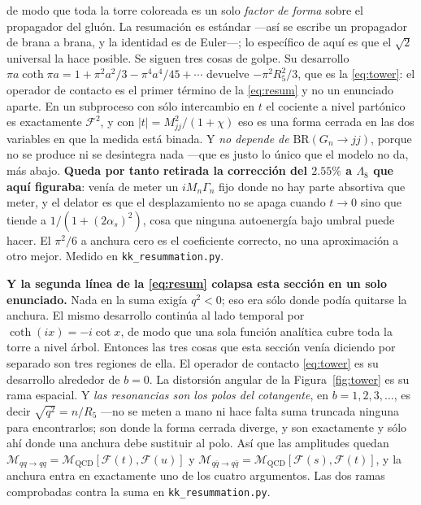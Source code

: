 \documentclass[11pt,a4paper]{article}
\begin{document}
\noindent de modo que toda la torre coloreada es un solo \emph{factor de forma} sobre el propagador
del gluón. La resumación es estándar ---así se escribe un propagador de brana a brana, y la
identidad es de Euler---; lo específico de aquí es que el $\sqrt2$ universal la hace posible. Se
siguen tres cosas de golpe. Su desarrollo $\pi a\coth\pi a=1+\pi^2a^2/3-\pi^4a^4/45+\cdots$
devuelve $-\pi^2R_5^2/3$, que es la \eqref{eq:tower}: el operador de contacto es el primer término
de la \eqref{eq:resum} y no un enunciado aparte. En un subproceso con sólo intercambio en $t$ el
cociente a nivel partónico es exactamente $\mathcal F^2$, y con $|t|=M_{jj}^2/(1+\chi)$ eso es una
forma cerrada en las dos variables en que la medida está binada. Y \emph{no depende de}
$\mathrm{BR}(G_n\to jj)$, porque no se produce ni se desintegra nada ---que es justo lo único que
el modelo no da, más abajo. \textbf{Queda por tanto retirada la corrección del $2.55\%$ a
$\Lambda_8$ que aquí figuraba}: venía de meter un $iM_n\Gamma_n$ fijo donde no hay parte absortiva
que meter, y el delator es que el desplazamiento no se apaga cuando $t\to0$ sino que tiende a
$1/(1+(2\alpha_s)^2)$, cosa que ninguna autoenergía bajo umbral puede hacer. El $\pi^2/6$ a
anchura cero es el coeficiente correcto, no una aproximación a otro mejor. Medido en
\texttt{kk\_\allowbreak resummation.py}.

\noindent\textbf{Y la segunda línea de la \eqref{eq:resum} colapsa esta sección en un
solo enunciado.} Nada en la suma exigía $q^2<0$; eso era sólo donde podía quitarse la
anchura. El mismo desarrollo continúa al lado temporal por $\coth(ix)=-i\cot x$, de modo que
una sola función analítica cubre toda la torre a nivel árbol. Entonces las tres cosas que
esta sección venía diciendo por separado son tres regiones de ella. El operador de contacto
\eqref{eq:tower} es su desarrollo alrededor de $b=0$. La distorsión angular de la
Figura~\ref{fig:tower} es su rama espacial. Y \emph{las resonancias son los polos del
cotangente}, en $b=1,2,3,\dots$, es decir $\sqrt{q^2}=n/R_5$ ---no se meten a mano ni hace
falta suma truncada ninguna para encontrarlos; son donde la forma cerrada diverge, y son
exactamente y sólo ahí donde una anchura debe sustituir al polo. Así que las amplitudes quedan
$\mathcal M_{qq\to qq}=\mathcal M_{\mathrm{QCD}}[\mathcal F(t),\mathcal F(u)]$ y
$\mathcal M_{q\bar q\to q\bar q}=\mathcal M_{\mathrm{QCD}}[\mathcal F(s),\mathcal F(t)]$, y la
anchura entra en exactamente uno de los cuatro argumentos. Las dos ramas comprobadas contra
la suma en \texttt{kk\_\allowbreak resummation.py}.
\end{document}
